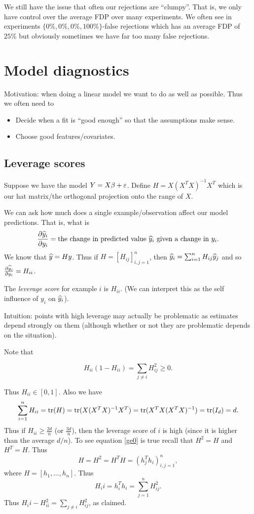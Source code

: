 We still have the issue that often our rejections are ``clumpy''. That is, we only have control over the average FDP over many experiments. We often see in experiments $\{0\%, 0\%, 0\%, 100\%\}$-false rejections which has an average FDP of $25\%$ but obviously sometimes we have far too many false rejections. 

\section{Model diagnostics}
Motivation: when doing a linear model we want to do as well as possible. Thus we often need to
\begin{itemize}
    \item Decide when a fit is ``good enough'' so that the assumptions make sense.
    \item Choose good features/covariates.
\end{itemize}
\subsection{Leverage scores}
Suppose we have the model $Y = X\beta +\varepsilon$. Define $H=X(X^TX)^{-1}X^T$ which is our hat matrix/the orthogonal projection onto the range of $X$. 

We can ask how much does a single example/observation affect our model predictions. That is, what is 
\[\frac{\partial \widehat{y}_i}{\partial y_i} = \text{the change in predicted value $\widehat{y}_i$ given a change in $y_i$}. \]
We know that $\widehat{y}=Hy$. Thus if $H=[H_{ij}]_{i,j=1}^n$, then $\widehat{y}_i = \sum_{i=1}^n H_{ij}\widehat{y}_j$ and so $\frac{\partial \widehat{y}_i}{\partial y_i} = H_{ii}$.
\begin{defn}
    The \emph{leverage score} for example $i$ is $H_{ii}$. (We can interpret this as the self influence of $y_i$ on $\widehat{y}_i$).
\end{defn}
Intuition: points with high leverage may actually be problematic as estimates depend strongly on them (although whether or not they are problematic depends on the situation).

Note that

\begin{equation}\label{ge0}
    H_{ii}(1-H_{ii}) = \sum_{j\neq i}H_{ij}^2 \ge 0.
\end{equation}

Thus $H_{ii} \in [0,1]$. Also we have
\[\sum_{i=1}^n H_{ii} = \operatorname*{tr}(H) = \operatorname*{tr}(X(X^TX)^{-1}X^T) = \operatorname*{tr}(X^TX(X^TX)^{-1}) =\operatorname*{tr}(I_d) = d. \]
Thus if $H_{ii} \ge \frac{2d}{n}$ (or $\frac{3d}{n}$), then the leverage score of $i$ is high (since it is higher than the average $d/n$). To see equation \eqref{ge0} is true recall that $H^2=H$ and $H^T = H$. Thus
\[H=H^2 =H^TH = (h^T_jh_i)_{i,j=1}^n, \]
where $H=[h_1,\ldots, h_n]$. Thus 
\[ H_ii = h_i^Th_i = \sum_{j=1}^n H_{ij}^2.\]
Thus $H_ii - H_{ii}^2 = \sum_{j\neq i} H_{ij}^2$, as claimed.

